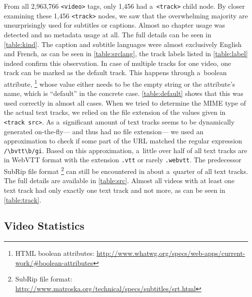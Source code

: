 \documentclass{sig-alternate}
\newcommand{\inlinelistingsize}{\fontsize{8pt}{11pt}}
\let\oldurl\url
\renewcommand{\url}[1]{\inlinelistingsize\oldurl{#1}}
\begin{document}
From all 2,963,766 \texttt{<video>} tags,
only 1,456 had a~\texttt{<track>} child node.
By closer examining these 1,456 \texttt{<track>} nodes,
we saw that the overwhelming majority are unsurprisingly
used for subtitles or captions.
Almost no chapter usage was detected
and no metadata usage at all.
The full details can be seen in \autoref{table:kind}.
The caption and subtitle languages were
almost exclusively English and French,
as can be seen in \autoref{table:srclang},
the track labels listed in \autoref{table:label}
indeed confirm this observation.
In case of multiple tracks for one video,
one track can be marked as the default track.
This happens through a~boolean attribute,%
\footnote{HTML boolean attributes:
\url{http://www.whatwg.org/specs/web-apps/current-work/\#boolean-attributes}}
whose value either needs to be the empty string
or the attribute's name,
which is ``default'' in the concrete case.
\autoref{table:default}
shows that this was used correctly in almost all cases.
When we tried to determine the MIME type of the actual
text tracks, we relied on the file extension
of the values given in \texttt{<track src>}.
As a~significant amount of text tracks
seems to be dynamically generated on-the-fly---%
and thus had no file extension---%
we used an approximation to check if some part
of the URL matched the regular expression \texttt{/\textbackslash bvtt\textbackslash b/gi}.
Based on this approximation,
a~little over half of all text tracks
are in WebVTT format
with the extension \texttt{.vtt}
or rarely \texttt{.webvtt}.
The predecessor SubRip file format%
\footnote{SubRip file format:
\url{http://www.matroska.org/technical/specs/subtitles/srt.html}}
can still be encountered in about
a~quarter of all text tracks.
The full details are available in \autoref{table:src}.
Almost all videos with at least one text track
had only exactly one text track and not more,
as can be seen in \autoref{table:track}.

\subsection{Video Statistics}
\end{document}
